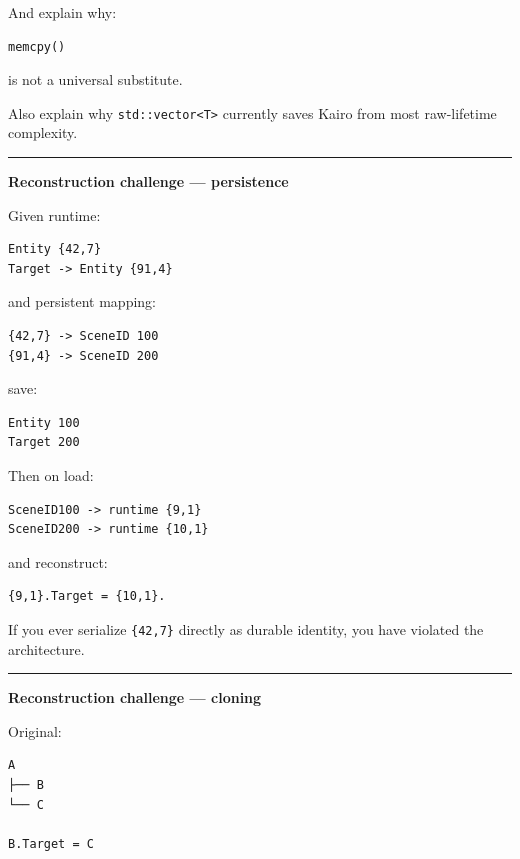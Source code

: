 And explain why:

\begin{verbatim}
memcpy()
\end{verbatim}

is not a universal substitute.

Also explain why \texttt{std::vector\textless{}T\textgreater{}} currently saves Kairo from most raw-lifetime complexity.

\begin{center}\rule{0.5\linewidth}{0.5pt}\end{center}

\textbf{Reconstruction challenge --- persistence}

Given runtime:

\begin{verbatim}
Entity {42,7}
Target -> Entity {91,4}
\end{verbatim}

and persistent mapping:

\begin{verbatim}
{42,7} -> SceneID 100
{91,4} -> SceneID 200
\end{verbatim}

save:

\begin{verbatim}
Entity 100
Target 200
\end{verbatim}

Then on load:

\begin{verbatim}
SceneID100 -> runtime {9,1}
SceneID200 -> runtime {10,1}
\end{verbatim}

and reconstruct:

\begin{verbatim}
{9,1}.Target = {10,1}.
\end{verbatim}

If you ever serialize \texttt{\{42,7\}} directly as durable identity, you have violated the architecture.

\begin{center}\rule{0.5\linewidth}{0.5pt}\end{center}

\textbf{Reconstruction challenge --- cloning}

Original:

\begin{verbatim}
A
├── B
└── C

B.Target = C
\end{verbatim}

